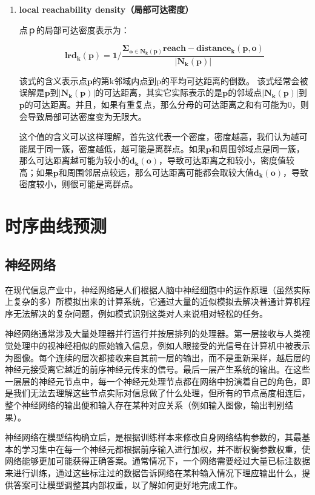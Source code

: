 \documentclass[a4paper,AutoFakeBold,oneside,12pt]{book}
\begin{document}
\begin{enumerate}
	\item \textbf{ local reachability density（局部可达密度）}

	点ｐ的局部可达密度表示为：

	\begin{equation}
	\bm{lrd_k(p)}=\bm{1}/\frac{\bm{\Sigma_{o\in N_k(p)} reach-distance_k(p,o)}}{\bm{|N_k(p)|}}
	\end{equation}

	该式的含义表示点$\bm{p}$的第k邻域内点到p的平均可达距离的倒数。 该式经常会被误解是$\bm{p}$到$\bm{|N_k(p)|}$的可达距离，其实它实际表示的是$\bm{p}$的邻域点$\bm{|N_k(p)|}$到$\bm{p}$的可达距离。并且，如果有重复点，那么分母的可达距离之和有可能为0，则会导致局部可达密度变为无限大。

	这个值的含义可以这样理解，首先这代表一个密度，密度越高，我们认为越可能属于同一簇，密度越低，越可能是离群点。如果$\bm{p}$和周围邻域点是同一簇，那么可达距离越可能为较小的$\bm{d_k(o)}$，导致可达距离之和较小，密度值较高；如果$\bm{p}$和周围邻居点较远，那么可达距离可能都会取较大值$\bm{d_k(o)}$，导致密度较小，则很可能是离群点。 
	\end{enumerate}
	
\section{时序曲线预测}
\subsection{神经网络}
	在现代信息产业中，神经网络是人们根据人脑中神经细胞中的运作原理（虽然实际上复杂的多）所模拟出来的计算系统，它通过大量的近似模拟去解决普通计算机程序无法解决的复杂问题，例如模式识别这类对人来说相对轻松的任务。

	神经网络通常涉及大量处理器并行运行并按层排列的处理器。第一层接收与人类视觉处理中的视神经相似的原始输入信息，例如人眼接受的光信号在计算机中被表示为图像。每个连续的层次都接收来自其前一层的输出，而不是重新采样，越后层的神经元接受离它越近的前序神经元传来的信号。最后一层产生系统的输出。在这些一层层的神经元节点中，每一个神经元处理节点都在网络中扮演着自己的角色，即是我们无法去理解这些节点实际对信息做了什么处理，但所有的节点高度相连后，整个神经网络的输出便和输入存在某种对应关系（例如输入图像，输出判别结果）。

	神经网络在模型结构确立后，是根据训练样本来修改自身网络结构参数的，其最基本的学习集中在每一个神经元都根据前序输入进行加权，并不断权衡参数权重，使网络能够更加可能获得正确答案。通常情况下，一个网络需要经过大量已标注数据来进行训练，通过这些标注过的数据告诉网络在某种输入情况下理应输出什么，提供答案可让模型调整其内部权重，以了解如何更好地完成工作。
\end{document}
